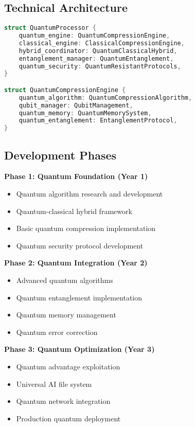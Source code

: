 \documentclass[12pt,a4paper]{article}
\begin{document}
\subsection{Technical Architecture}
\begin{lstlisting}[language=C, caption=V5.0 Quantum Architecture]
struct QuantumProcessor {
    quantum_engine: QuantumCompressionEngine,
    classical_engine: ClassicalCompressionEngine,
    hybrid_coordinator: QuantumClassicalHybrid,
    entanglement_manager: QuantumEntanglement,
    quantum_security: QuantumResistantProtocols,
}

struct QuantumCompressionEngine {
    quantum_algorithm: QuantumCompressionAlgorithm,
    qubit_manager: QubitManagement,
    quantum_memory: QuantumMemorySystem,
    quantum_entanglement: EntanglementProtocol,
}
\end{lstlisting}

\subsection{Development Phases}
\textbf{Phase 1: Quantum Foundation (Year 1)}
\begin{itemize}
    \item Quantum algorithm research and development
    \item Quantum-classical hybrid framework
    \item Basic quantum compression implementation
    \item Quantum security protocol development
\end{itemize}

\textbf{Phase 2: Quantum Integration (Year 2)}
\begin{itemize}
    \item Advanced quantum algorithms
    \item Quantum entanglement implementation
    \item Quantum memory management
    \item Quantum error correction
\end{itemize}

\textbf{Phase 3: Quantum Optimization (Year 3)}
\begin{itemize}
    \item Quantum advantage exploitation
    \item Universal AI file system
    \item Quantum network integration
    \item Production quantum deployment
\end{itemize}
\end{document}
